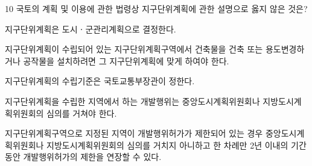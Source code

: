 \begin{question}{10}
국토의 계획 및 이용에 관한 법령상 지구단위계획에 관한 설명으로 옳지 않은 것은?
\begin{choices}
  \item 지구단위계획은 도시ㆍ군관리계획으로 결정한다.
  \item 지구단위계획이 수립되어 있는 지구단위계획구역에서 건축물을 건축 또는 용도변경하거나 공작물을 설치하려면 그 지구단위계획에 맞게 하여야 한다.
  \item 지구단위계획의 수립기준은 국토교통부장관이 정한다.
  \item 지구단위계획을 수립한 지역에서 하는 개발행위는 중앙도시계획위원회나 지방도시계획위원회의 심의를 거쳐야 한다.
  \item 지구단위계획구역으로 지정된 지역이 개발행위허가가 제한되어 있는 경우 중앙도시계획위원회나 지방도시계획위원회의 심의를 거치지 아니하고 한 차례만 2년 이내의 기간 동안 개발행위허가의 제한을 연장할 수 있다.
\end{choices}
\end{question}
